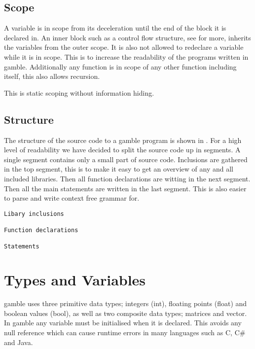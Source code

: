 \subsection*{Scope}
A variable is in scope from its deceleration until the end of the block it is declared in.
An inner block such as a control flow structure, see  for more, inherits the variables from the outer scope. 
It is also not allowed to redeclare a variable while it is in scope. 
This is to increase the readability of the programs written in \gls{gamble}.
Additionally any function is in scope of any other function including itself, this also allows recursion. 

This is static scoping without information hiding. 

\subsection*{Structure} 
The structure of the source code to a \gls{gamble} program is shown in .
For a high level of readability we have decided  to split the source code up in segments.
A single segment contains only a small part of source code.
Inclusions are gathered in the top segment, this is to make it easy to get an overview of any and all included libraries. 
Then all function declarations are witting in the next segment.
Then all the main statements are written in the last segment. 
This is also easier to parse and write context free grammar for.  

\begin{lstlisting}[caption={Source code file layout in \gls{gamble}},frame=tlrb,label={lst:Structure}, numbers=none]
Libary inclusions

Function declarations

Statements
\end{lstlisting}

\section{Types and Variables} \label{sec:Types}
\gls{gamble} uses three primitive data types; integers (int), floating points (float) and boolean values (bool), as well as two composite data types; matrices and vector. 
In \gls{gamble} any variable must be initialised when it is declared. 
This avoids any null reference which can cause runtime errors in many languages such as C, C\# and Java. 

